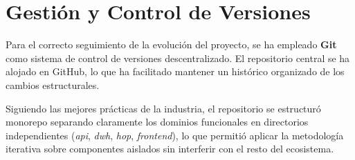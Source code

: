 \section{Gestión y Control de Versiones}
Para el correcto seguimiento de la evolución del proyecto, se ha empleado \textbf{Git} como sistema de control de versiones descentralizado. El repositorio central se ha alojado en GitHub, lo que ha facilitado mantener un histórico organizado de los cambios estructurales.

Siguiendo las mejores prácticas de la industria, el repositorio se estructuró monorepo separando claramente los dominios funcionales en directorios independientes (\textit{api}, \textit{dwh}, \textit{hop}, \textit{frontend}), lo que permitió aplicar la metodología iterativa sobre componentes aislados sin interferir con el resto del ecosistema.
